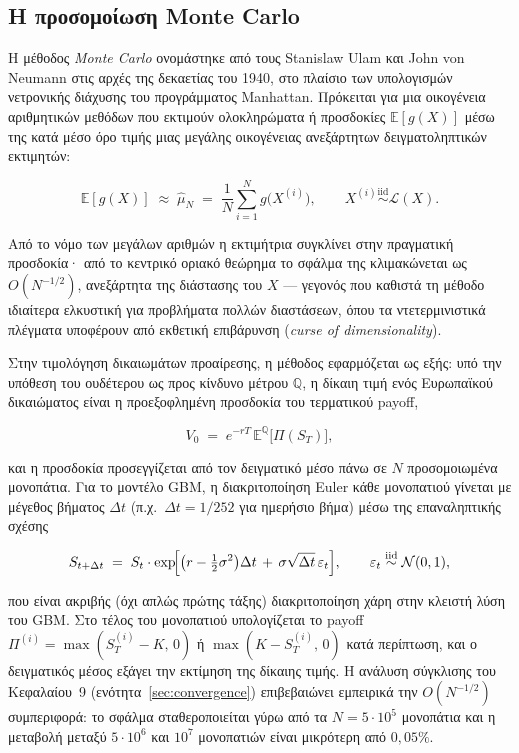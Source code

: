 \documentclass[12pt]{article}
\begin{document}
\subsection{Η προσομοίωση Monte Carlo}

Η μέθοδος \emph{Monte Carlo} ονομάστηκε από τους Stanislaw Ulam και John von Neumann στις αρχές της δεκαετίας του 1940, στο πλαίσιο των υπολογισμών νετρονικής διάχυσης του προγράμματος Manhattan. Πρόκειται για μια οικογένεια αριθμητικών μεθόδων που εκτιμούν ολοκληρώματα ή προσδοκίες $\mathbb{E}[g(X)]$ μέσω της κατά μέσο όρο τιμής μιας μεγάλης οικογένειας ανεξάρτητων δειγματοληπτικών εκτιμητών:

$$
\mathbb{E}[g(X)] \;\approx\; \widehat{\mu}_N \;=\; \frac{1}{N}\sum_{i=1}^N g\bigl(X^{(i)}\bigr), \qquad X^{(i)} \overset{\text{iid}}{\sim} \mathcal{L}(X).
$$

Από το νόμο των μεγάλων αριθμών η εκτιμήτρια συγκλίνει στην πραγματική προσδοκία· από το κεντρικό οριακό θεώρημα το σφάλμα της κλιμακώνεται ως $O(N^{-1/2})$, ανεξάρτητα της διάστασης του $X$ — γεγονός που καθιστά τη μέθοδο ιδιαίτερα ελκυστική για προβλήματα πολλών διαστάσεων, όπου τα ντετερμινιστικά πλέγματα υποφέρουν από εκθετική επιβάρυνση (\emph{curse of dimensionality}).

Στην τιμολόγηση δικαιωμάτων προαίρεσης, η μέθοδος εφαρμόζεται ως εξής: υπό την υπόθεση του ουδέτερου ως προς κίνδυνο μέτρου $\mathbb{Q}$, η δίκαιη τιμή ενός Ευρωπαϊκού δικαιώματος είναι η προεξοφλημένη προσδοκία του τερματικού payoff,

$$
V_0 \;=\; e^{-rT}\,\mathbb{E}^{\mathbb{Q}}\bigl[\Pi(S_T)\bigr],
$$

και η προσδοκία προσεγγίζεται από τον δειγματικό μέσο πάνω σε $N$ προσομοιωμένα μονοπάτια. Για το μοντέλο GBM, η διακριτοποίηση Euler κάθε μονοπατιού γίνεται με μέγεθος βήματος $\Delta t$ (π.χ.\ $\Delta t = 1/252$ για ημερήσιο βήμα) μέσω της επαναληπτικής σχέσης

$$
S_{t+\Delta t} \;=\; S_t \cdot \exp\!\Bigl[\bigl(r - \tfrac{1}{2}\sigma^2\bigr)\Delta t \,+\, \sigma\sqrt{\Delta t}\,\varepsilon_t\Bigr], \qquad \varepsilon_t \overset{\text{iid}}{\sim} \mathcal{N}(0, 1),
$$

που είναι ακριβής (όχι απλώς πρώτης τάξης) διακριτοποίηση χάρη στην κλειστή λύση του GBM. Στο τέλος του μονοπατιού υπολογίζεται το payoff $\Pi^{(i)} = \max(S_T^{(i)} - K,\,0)$ ή $\max(K - S_T^{(i)},\, 0)$ κατά περίπτωση, και ο δειγματικός μέσος εξάγει την εκτίμηση της δίκαιης τιμής. Η ανάλυση σύγκλισης του Κεφαλαίου~9 (ενότητα~\ref{sec:convergence}) επιβεβαιώνει εμπειρικά την $O(N^{-1/2})$ συμπεριφορά: το σφάλμα σταθεροποιείται γύρω από τα $N = 5 \cdot 10^5$ μονοπάτια και η μεταβολή μεταξύ $5 \cdot 10^6$ και $10^7$ μονοπατιών είναι μικρότερη από $0{,}05\%$.
\end{document}
